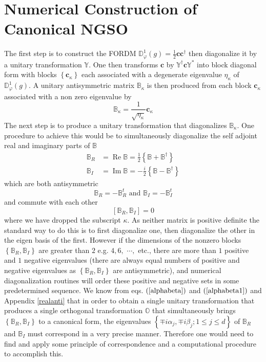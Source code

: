 \documentclass[aps,preprint]{revtex4}%
\begin{document}
\section{Numerical Construction of Canonical NGSO\label{numerical}}

The first step is to construct the FORDM $\mathbb{D}_{\varphi}^{1}\left(
g\right)  =\frac{1}{2}\mathbf{cc}^{\dagger}$ then diagonalize it by a unitary
transformation $\mathbb{Y}$. One then transforms $\mathbf{c}$ by
$\mathbb{Y}^{\dagger}\mathbf{c}\mathbb{Y}^{\ast}$ into block diagonal form
with blocks $\left\{  \mathbf{c}_{\kappa}\right\}  $ each associated with a
degenerate eigenvalue $\eta_{\kappa}$ of $\mathbb{D}_{\varphi}^{1}\left(
g\right)  .$ A unitary antisymmetric matrix $\mathbb{B}_{\kappa}$ is then
produced from each block $\mathbf{c}_{\kappa}$ associated with a non zero
eigenvalue by
\begin{equation}
\mathbb{B}_{\kappa}=\frac{1}{\sqrt{\eta_{\kappa}}}\mathbf{c}_{\kappa}%
\end{equation}
The next step is to produce a unitary transformation that diagonalizes
$\mathbb{B}_{\kappa}$. One procedure to achieve this would be to
simultaneously diagonalize the self adjoint real and imaginary parts of
$\mathbb{B}$
\begin{align}
\mathbb{B}_{R}  &  =\operatorname{Re}\mathbb{B}=\frac{1}{2}\left\{
\mathbb{B+B}^{\dagger}\right\} \nonumber\\
\mathbb{B}_{I}  &  =\operatorname{Im}\mathbb{B}=-\frac{i}{2}\left\{
\mathbb{B-B}^{\dagger}\right\}
\end{align}
which are both antisymmetric
\begin{equation}
\mathbb{B}_{R}=-\mathbb{B}_{R}^{t}\text{ and }\mathbb{B}_{I}=-\mathbb{B}%
_{I}^{t}%
\end{equation}
and commute with each other
\begin{equation}
\left[  \mathbb{B}_{R},\mathbb{B}_{I}\right]  =0
\end{equation}
where we have dropped the subscript $\kappa$. As neither matrix is positive
definite the standard way to do this is to first diagonalize one, then
diagonalize the other in the eigen basis of the first. However if the
dimensions of the nonzero blocks $\left\{  \mathbb{B}_{R},\mathbb{B}%
_{I}\right\}  $ are greater than $2$ e.g. $4,6,$ $\cdots,$ etc., there are
more than $1$ positive and $1$ negative eigenvalues (there are always equal
numbers of positive and negative eigenvalues as $\left\{  \mathbb{B}%
_{R},\mathbb{B}_{I}\right\}  $ are antisymmetric), and numerical
diagonalization routines will order these positive and negative sets in some
predetermined sequence. We know from eqs. $\left(  \ref{alphabeta}\right)  $
and $\left(  \ref{alphabeta1}\right)  $ and Appendix \ref{realanti} that in
order to obtain a single unitary transformation that produces a single
orthogonal transformation $\mathbb{O}$ that simultaneously brings $\left\{
\mathbb{B}_{R},\mathbb{B}_{I}\right\}  $ to a canonical form, the eigenvalues
$\left\{  \mp i\alpha_{j},\mp i\beta_{j};1\leq j\leq d\right\}  $ of
$\mathbb{B}_{R}$ and $\mathbb{B}_{I}$ must correspond in a very precise
manner. Therefore one would need to find and apply some principle of
correspondence and a computational procedure to accomplish this.
\end{document}
